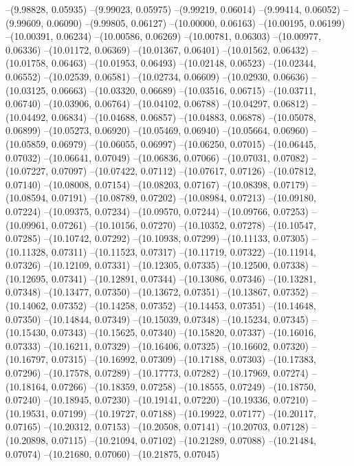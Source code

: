 --(9.98828, 0.05935)
--(9.99023, 0.05975)
--(9.99219, 0.06014)
--(9.99414, 0.06052)
--(9.99609, 0.06090)
--(9.99805, 0.06127)
--(10.00000, 0.06163)
--(10.00195, 0.06199)
--(10.00391, 0.06234)
--(10.00586, 0.06269)
--(10.00781, 0.06303)
--(10.00977, 0.06336)
--(10.01172, 0.06369)
--(10.01367, 0.06401)
--(10.01562, 0.06432)
--(10.01758, 0.06463)
--(10.01953, 0.06493)
--(10.02148, 0.06523)
--(10.02344, 0.06552)
--(10.02539, 0.06581)
--(10.02734, 0.06609)
--(10.02930, 0.06636)
--(10.03125, 0.06663)
--(10.03320, 0.06689)
--(10.03516, 0.06715)
--(10.03711, 0.06740)
--(10.03906, 0.06764)
--(10.04102, 0.06788)
--(10.04297, 0.06812)
--(10.04492, 0.06834)
--(10.04688, 0.06857)
--(10.04883, 0.06878)
--(10.05078, 0.06899)
--(10.05273, 0.06920)
--(10.05469, 0.06940)
--(10.05664, 0.06960)
--(10.05859, 0.06979)
--(10.06055, 0.06997)
--(10.06250, 0.07015)
--(10.06445, 0.07032)
--(10.06641, 0.07049)
--(10.06836, 0.07066)
--(10.07031, 0.07082)
--(10.07227, 0.07097)
--(10.07422, 0.07112)
--(10.07617, 0.07126)
--(10.07812, 0.07140)
--(10.08008, 0.07154)
--(10.08203, 0.07167)
--(10.08398, 0.07179)
--(10.08594, 0.07191)
--(10.08789, 0.07202)
--(10.08984, 0.07213)
--(10.09180, 0.07224)
--(10.09375, 0.07234)
--(10.09570, 0.07244)
--(10.09766, 0.07253)
--(10.09961, 0.07261)
--(10.10156, 0.07270)
--(10.10352, 0.07278)
--(10.10547, 0.07285)
--(10.10742, 0.07292)
--(10.10938, 0.07299)
--(10.11133, 0.07305)
--(10.11328, 0.07311)
--(10.11523, 0.07317)
--(10.11719, 0.07322)
--(10.11914, 0.07326)
--(10.12109, 0.07331)
--(10.12305, 0.07335)
--(10.12500, 0.07338)
--(10.12695, 0.07341)
--(10.12891, 0.07344)
--(10.13086, 0.07346)
--(10.13281, 0.07348)
--(10.13477, 0.07350)
--(10.13672, 0.07351)
--(10.13867, 0.07352)
--(10.14062, 0.07352)
--(10.14258, 0.07352)
--(10.14453, 0.07351)
--(10.14648, 0.07350)
--(10.14844, 0.07349)
--(10.15039, 0.07348)
--(10.15234, 0.07345)
--(10.15430, 0.07343)
--(10.15625, 0.07340)
--(10.15820, 0.07337)
--(10.16016, 0.07333)
--(10.16211, 0.07329)
--(10.16406, 0.07325)
--(10.16602, 0.07320)
--(10.16797, 0.07315)
--(10.16992, 0.07309)
--(10.17188, 0.07303)
--(10.17383, 0.07296)
--(10.17578, 0.07289)
--(10.17773, 0.07282)
--(10.17969, 0.07274)
--(10.18164, 0.07266)
--(10.18359, 0.07258)
--(10.18555, 0.07249)
--(10.18750, 0.07240)
--(10.18945, 0.07230)
--(10.19141, 0.07220)
--(10.19336, 0.07210)
--(10.19531, 0.07199)
--(10.19727, 0.07188)
--(10.19922, 0.07177)
--(10.20117, 0.07165)
--(10.20312, 0.07153)
--(10.20508, 0.07141)
--(10.20703, 0.07128)
--(10.20898, 0.07115)
--(10.21094, 0.07102)
--(10.21289, 0.07088)
--(10.21484, 0.07074)
--(10.21680, 0.07060)
--(10.21875, 0.07045)
